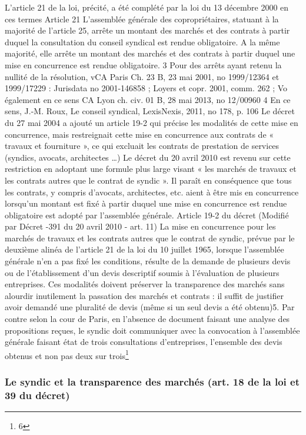 			L’article 21 de la loi, précité, a été complété par la loi du 13 décembre 2000 en ces termes
			Article 21
			L'assemblée générale des copropriétaires, statuant à la majorité de l'article 25, arrête un montant des marchés et des contrats à partir duquel la consultation du conseil syndical est rendue obligatoire. A la même majorité, elle arrête un montant des marchés et des contrats à partir duquel une mise en concurrence est rendue obligatoire.
			3 Pour des arrêts ayant retenu la nullité de la résolution, v\degres CA Paris Ch. 23 B, 23 mai 2001, no 1999/12364 et 1999/17229 : Jurisdata no 2001-146858 ; Loyers et copr. 2001, comm. 262 ; Vo également en ce sens CA Lyon ch. civ. 01 B, 28 mai 2013, no 12/00960
			4 En ce sens, J.-M. Roux, Le conseil syndical, LexisNexis, 2011, no 178, p. 106
			Le décret du 27 mai 2004 a ajouté un article 19-2 qui précise les modalités de cette mise en concurrence, mais restreignait cette mise en concurrence aux contrats de « travaux et fourniture », ce qui excluait les contrats de prestation de services (syndics, avocats, architectes …)
			Le décret du 20 avril 2010 est revenu sur cette restriction en adoptant une formule plus large visant « les marchés de travaux et les contrats autres que le contrat de syndic ». Il paraît en conséquence que tous les contrats, y compris d’avocats, architectes, etc. aient à être mis en concurrence lorsqu’un montant est fixé à partir duquel une mise en concurrence est rendue obligatoire est adopté par l’assemblée générale.
			Article 19-2 du décret (Modifié par Décret -391 du 20 avril 2010 - art. 11)
			La mise en concurrence pour les marchés de travaux et les contrats autres que le contrat de syndic, prévue par le deuxième alinéa de l’article 21 de la loi du 10 juillet 1965, lorsque l’assemblée générale n’en a pas fixé les conditions, résulte de la demande de plusieurs devis ou de l’établissement d’un devis descriptif soumis à l’évaluation de plusieurs entreprises.
			Ces modalités doivent préserver la transparence des marchés sans alourdir inutilement la passation des marchés et contrats : il suffit de justifier avoir demandé une pluralité de devis (même si un seul devis a été obtenu)5.
			Par contre selon la cour de Paris, en l’absence de document faisant une analyse des propositions reçues, le syndic doit communiquer avec la convocation à l’assemblée générale faisant état de trois consultations d’entreprises, l’ensemble des devis obtenus et non pas deux sur trois\footnote{6}
			
		\subsubsection{Le syndic et la transparence des marchés (art. 18 de la loi et 39 du décret)}
		
